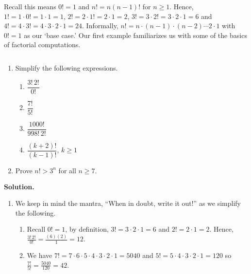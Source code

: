 \documentclass{ximera}
\begin{document}
Recall this means $0! = 1$ and $n! = n(n-1)!$ for $n \geq 1$.  Hence, $1! = 1 \cdot 0! = 1 \cdot 1 = 1$, $2! = 2 \cdot 1! = 2 \cdot 1 = 2$, $3! = 3 \cdot 2! = 3 \cdot 2 \cdot 1 = 6$ and  $4! = 4 \cdot 3! = 4 \cdot 3 \cdot 2 \cdot 1 = 24$. Informally, $n! = n\cdot(n -1)\cdot(n -2) \cdots 2 \cdot 1$ with $0! = 1$ as our `base case.'  Our first example familiarizes us with some of the basics of factorial computations.

\begin{example}  \label{factorialex}  $~$

\begin{enumerate} 

\item  Simplify the following expressions.

\begin{multicols}{4}

\begin{enumerate}

\item  $\dfrac{3! \, 2!}{0!}$

\item  $\dfrac{7!}{5!}$

\item  $\dfrac{1000!}{998! \, 2!}$

\item  $\dfrac{(k+2)!}{(k-1)!}$, $k \geq 1$

\end{enumerate}

\end{multicols}

\item  Prove $n! > 3^n$ for all $n \geq 7$.

\end{enumerate}

{\bf Solution.}  

\begin{enumerate}

\item  We keep in mind the mantra, ``When in doubt, write it out!'' as we simplify the following.

\begin{enumerate}

\item  Recall $0! = 1$, by definition,  $3! = 3 \cdot 2 \cdot 1 = 6$ and $2! = 2 \cdot 1 = 2$. Hence, $\frac{3! \, 2!}{0!} = \frac{(6)(2)}{1} = 12$.

\item We have $7! = 7 \cdot 6 \cdot 5 \cdot 4 \cdot 3 \cdot 2 \cdot 1 = 5040$ and $5! = 5 \cdot 4 \cdot 3 \cdot 2 \cdot 1 = 120$ so $\frac{7!}{5!} = \frac{5040}{120} = 42$. 


\end{enumerate}
\end{enumerate}
\end{example}
\end{document}

